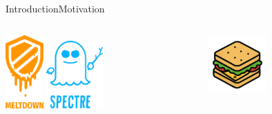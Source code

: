 \documentclass[aspectratio=169, hyperref={colorlinks=true, allcolors=SecondaryColor}, c]{beamer}
\begin{document}
	\begin{frame}[fragile]{Introduction}{Motivation}
		\begin{columns}
			\begin{column}[t]{0.5\textwidth}
				\begin{center}
					\includegraphics[width=0.2\textwidth]{./figures/meltdown.png}\hspace{0.4cm}\cite{MeltdownSecurityVulnerability2024}
					\hspace{0.5cm}
					\includegraphics[width=0.3\textwidth]{./figures/spectre.png}\cite{SpectreSecurityVulnerability2025}
				\end{center}
			\end{column}
			\begin{column}[t]{0.5\textwidth}
				\begin{center}
					\includegraphics[width=0.4\textwidth]{./figures/sandwich_alpha.png}
				\end{center}
			\end{column}

\end{columns}
\end{frame}
\end{document}
